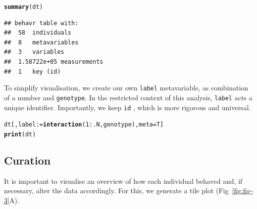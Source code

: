 \documentclass[10pt,letterpaper]{article}\usepackage[]{graphicx}\usepackage[]{color}
\makeatletter
\newcommand{\hlnum}[1]{\textcolor[rgb]{0.686,0.059,0.569}{#1}}%
\newcommand{\hlopt}[1]{\textcolor[rgb]{0,0,0}{#1}}%
\newcommand{\hlstd}[1]{\textcolor[rgb]{0.345,0.345,0.345}{#1}}%
\newcommand{\hlkwb}[1]{\textcolor[rgb]{0.69,0.353,0.396}{#1}}%
\newcommand{\hlkwc}[1]{\textcolor[rgb]{0.333,0.667,0.333}{#1}}%
\newcommand{\hlkwd}[1]{\textcolor[rgb]{0.737,0.353,0.396}{\textbf{#1}}}%
\newenvironment{kframe}{%
 \def\at@end@of@kframe{}%
 \ifinner\ifhmode%
  \def\at@end@of@kframe{\end{minipage}}%
  \begin{minipage}{\columnwidth}%
 \fi\fi%
 \def\FrameCommand##1{\hskip\@totalleftmargin \hskip-\fboxsep
 \colorbox{shadecolor}{##1}\hskip-\fboxsep
     \hskip-\linewidth \hskip-\@totalleftmargin \hskip\columnwidth}%
 \MakeFramed {\advance\hsize-\width
   \@totalleftmargin\z@ \linewidth\hsize
   \@setminipage}}%
 {\par\unskip\endMakeFramed%
 \at@end@of@kframe}
\newenvironment{knitrout}{}{} %
\makeatother
\begin{document}
\begin{knitrout}
\color{fgcolor}\begin{kframe}
\begin{alltt}
\hlkwd{summary}\hlstd{(dt)}
\end{alltt}
\begin{verbatim}
## behavr table with:
##  58	individuals
##  8	metavariables
##  3	variables
##  1.58722e+05	measurements
##  1	key (id)
\end{verbatim}
\end{kframe}
\end{knitrout}

To simplify visualisation, we create our own \texttt{label} metavariable, as combination of a number and \texttt{genotype}.
In the restricted context of this analysis, \texttt{label} acts a unique identifier.
Importantly, we keep \texttt{id} , which is more rigorous and universal.



\begin{knitrout}
\color{fgcolor}\begin{kframe}
\begin{alltt}
\hlstd{dt[, label} \hlkwb{:=} \hlkwd{interaction}\hlstd{(}\hlnum{1}\hlopt{:}\hlstd{.N, genotype),} \hlkwc{meta}\hlstd{=T]}
\hlkwd{print}\hlstd{(dt)}
\end{alltt}
\end{kframe}
\end{knitrout}


\subsection*{Curation}
It is important to visualise an overview of how each individual behaved and, if necessary, alter the data accordingly. For this, we generate a tile plot (Fig~\ref{fig:fig-3}A).
\end{document}
